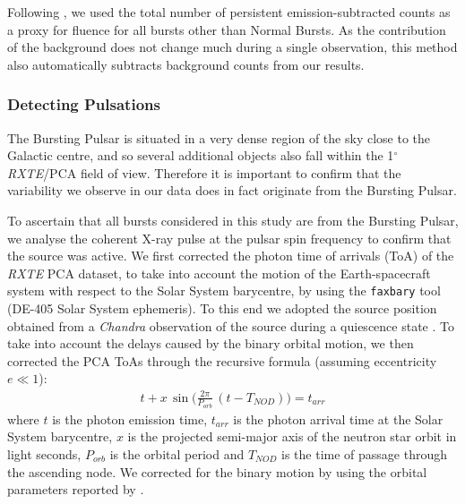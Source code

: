 \par Following \citet{Bagnoli_PopStudy}, we used the total number of persistent emission-subtracted counts as a proxy for fluence for all bursts other than Normal Bursts.  As the contribution of the background does not change much during a single observation, this method also automatically subtracts background counts from our results.

\subsubsection{Detecting Pulsations}

\par The Bursting Pulsar is situated in a very dense region of the sky close to the Galactic centre, and so several additional objects also fall within the 1$^\circ$ \textit{RXTE}/PCA field of view.  Therefore it is important to confirm that the variability we observe in our data does in fact originate from the Bursting Pulsar.
\par To ascertain that all bursts considered in this study are from the Bursting Pulsar, we analyse the coherent X-ray pulse at the pulsar spin frequency to confirm that the source was active.  We first corrected the photon time of arrivals (ToA) of the \textit{RXTE} PCA dataset, to take into account the motion of the Earth-spacecraft system with respect to the Solar System barycentre, by using the \texttt{faxbary} tool (DE-405 Solar System ephemeris). To this end we adopted the source position obtained from a \textit{Chandra} observation of the source during a quiescence state \citep[RA=266.137875$^{\circ}$ DEC=-28.740833$^{\circ}$, 1$\sigma$ confidence radius of 0.8''][]{Wijnands_BPQ}. To take into account the delays caused by the binary orbital motion, we then corrected the PCA ToAs through the recursive formula (assuming eccentricity $e \ll 1$): 
\begin{eqnarray}
\label{eq:barygen} 
t + x\,\sin\Big(\frac{2\pi}{P_{orb}} \,(t-T_{NOD})\Big) = t_{arr}
\end{eqnarray}
where $t$ is the photon emission time, $t_{arr}$ is the photon arrival time at the Solar System barycentre, $x$ is the projected semi-major axis of the neutron star orbit in light seconds, $P_{orb}$ is the orbital period and $T_{NOD}$ is the time of passage through the ascending node. We corrected for the binary motion by using the orbital parameters reported by \citet{Finger_Pulse}.
